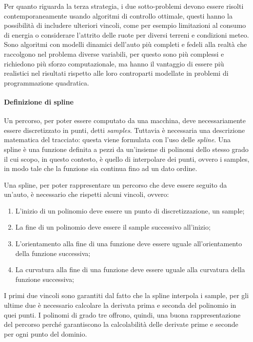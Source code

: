 Per quanto riguarda la terza strategia, i due sotto-problemi devono essere risolti contemporaneamente
usando algoritmi di controllo ottimale, questi hanno la possibilità di includere ulteriori vincoli, come
per esempio limitazioni al consumo di energia o considerare l'attrito delle ruote per diversi terreni e
condizioni meteo.\cite{christ2021time} Sono algoritmi con modelli dinamici dell'auto più completi e
fedeli alla realtà che raccolgono nel problema diverse variabili, per questo sono più complessi e
richiedono più sforzo computazionale, ma hanno il vantaggio di essere più realistici nel risultati
rispetto alle loro controparti modellate in problemi di programmazione quadratica.

\paragraph{Definizione di spline \cite{olausson2021optimal} \cite{globalplanning-lec}}
\label{par:spline-def}
Un percorso, per poter essere computato da una macchina, deve necessariamente essere discretizzato in
punti, detti \textit{samples}.
Tuttavia è necessaria una descrizione matematica del tracciato: questa viene formulata con l'uso delle
\textit{spline}. Una spline è una funzione definita a pezzi da un'insieme di polinomi dello stesso grado
il cui scopo, in questo contesto, è quello di interpolare dei punti, ovvero i samples, in modo tale che
la funzione sia continua fino ad un dato ordine.

Una spline, per poter rappresentare un percorso che deve essere seguito da un'auto, è necessario che
rispetti alcuni vincoli, ovvero:
\begin{enumerate}
	\item L'inizio di un polinomio deve essere un punto di discretizzazione, un sample;
	\item La fine di un polinomio deve essere il sample successivo all'inizio;
	\item L'orientamento alla fine di una funzione deve essere uguale all'orientamento della funzione
	      successiva;
	\item La curvatura alla fine di una funzione deve essere uguale alla curvatura della funzione
	      successiva;
\end{enumerate}
I primi due vincoli sono garantiti dal fatto che la spline interpola i sample, per gli ultime due è
necessario calcolare la derivata prima e seconda del polinomio in quei punti. I polinomi di grado tre
offrono, quindi, una buona rappresentazione del percorso perché garantiscono la calcolabilità delle
derivate prime e seconde per ogni punto del dominio.

